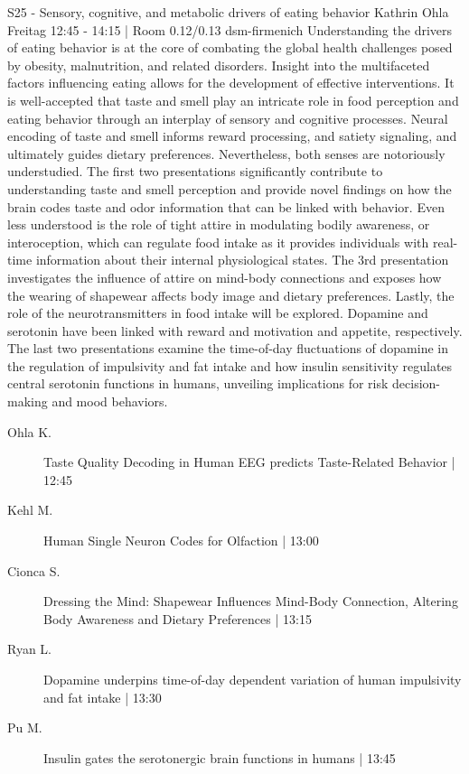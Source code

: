 
            \begin{symposium}
            {S25 - Sensory, cognitive, and metabolic drivers of eating behavior}
            {Kathrin Ohla}
            {Freitag 12:45 - 14:15 | Room 0.12/0.13}
            {dsm-firmenich}
            Understanding the drivers of eating behavior is at the core of combating the global health challenges posed by obesity, malnutrition, and related disorders. Insight into the multifaceted factors influencing eating allows for the development of effective interventions. It is well-accepted that taste and smell play an intricate role in food perception and eating behavior through an interplay of sensory and cognitive processes. Neural encoding of taste and smell informs reward processing, and satiety signaling, and ultimately guides dietary preferences. Nevertheless, both senses are notoriously understudied. The first two presentations significantly contribute to understanding taste and smell perception and provide novel findings on how the brain codes taste and odor information that can be linked with behavior.
Even less understood is the role of tight attire in modulating bodily awareness, or interoception, which can regulate food intake as it provides individuals with real-time information about their internal physiological states. The 3rd presentation investigates the influence of attire on mind-body connections and exposes how the wearing of shapewear affects body image and dietary preferences. Lastly, the role of the neurotransmitters in food intake will be explored. Dopamine and serotonin have been linked with reward and motivation and appetite, respectively. The last two presentations examine the time-of-day fluctuations of dopamine in the regulation of impulsivity and fat intake and how insulin sensitivity regulates central serotonin functions in humans, unveiling implications for risk decision-making and mood behaviors.
            \begin{description}    
            
                \item [ Ohla K.] Taste Quality Decoding in Human EEG predicts Taste-Related Behavior \textcolor{mygray}{ | 12:45}    
                
                \item [ Kehl M.] Human Single Neuron Codes for Olfaction \textcolor{mygray}{ | 13:00}    
                
                \item [ Cionca S.] Dressing the Mind: Shapewear Influences Mind-Body Connection, Altering Body Awareness and Dietary Preferences \textcolor{mygray}{ | 13:15}    
                
                \item [ Ryan L.] Dopamine underpins time-of-day dependent variation of human impulsivity and fat intake \textcolor{mygray}{ | 13:30}    
                
                \item [ Pu M.] Insulin gates the serotonergic brain functions in humans \textcolor{mygray}{ | 13:45}    
                
            \end{description} 
            \end{symposium}
            